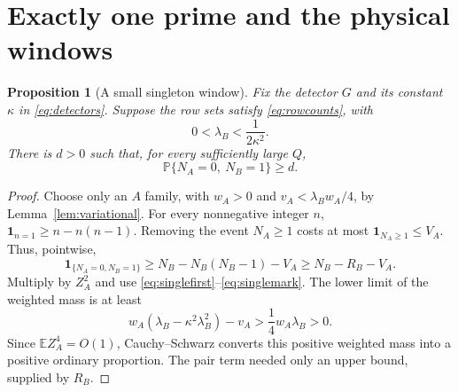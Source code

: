 \documentclass[11pt]{article}
\newtheorem{proposition}[theorem]{Proposition}
\theoremstyle{remark}
\numberwithin{equation}{section}
\newcommand{\E}{\mathbb E}
\newcommand{\PP}{\mathbb P}
\newcommand{\ind}{\mathbf 1}
\begin{document}
\section{Exactly one prime and the physical windows}
\label{sec:singleton}

\begin{proposition}[A small singleton window]\label{prop:singleton}
Fix the detector $G$ and its constant $\kappa$ in
\eqref{eq:detectors}. Suppose the row sets satisfy
\eqref{eq:rowcounts}, with
\[
 0<\lambda_B<\frac1{2\kappa^2}.
\]
There is $d>0$ such that, for every sufficiently large $Q$,
\[
 \PP\{N_A=0,\ N_B=1\}\ge d.
\]
\end{proposition}
\begin{proof}
Choose only an $A$ family, with $w_A>0$ and
$v_A<\lambda_Bw_A/4$, by Lemma~\ref{lem:variational}.
For every nonnegative integer $n$,
$\ind_{n=1}\ge n-n(n-1)$.
Removing the event $N_A\ge1$ costs at most
$\ind_{N_A\ge1}\le V_A$. Thus, pointwise,
\[
 \ind_{\{N_A=0,N_B=1\}}
 \ge N_B-N_B(N_B-1)-V_A
 \ge N_B-R_B-V_A.
\]
Multiply by $Z_A^2$ and use
\eqref{eq:singlefirst}--\eqref{eq:singlemark}.
The lower limit of the weighted mass is at least
\[
 w_A(\lambda_B-\kappa^2\lambda_B^2)-v_A
   >\frac14w_A\lambda_B>0.
\]
Since $\E Z_A^4=O(1)$, Cauchy--Schwarz converts this positive
weighted mass into a positive ordinary proportion.
The pair term needed only an upper bound, supplied by $R_B$.
\end{proof}
\end{document}
